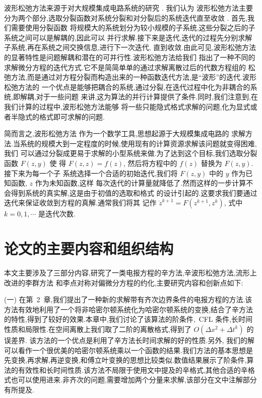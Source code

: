 波形松弛方法来源于对大规模集成电路系统的研究 \cite{lelarasmee1982waveform}. 我们认为
波形松弛方法主要分为两个部分,选取分裂函数对系统分裂和对分裂后的系统迭代直至收敛
 \cite{jiang2009wr,burrage1995parallel,jacob1985waveform}. 首先,我们需要使用分裂函数
 将规模大的系统划分为较小规模的子系统,这些分裂之后的子系统之间可以是解耦的,因此可以
 并行求解.接下来是迭代,迭代的过程先分别求解子系统,再在系统之间交换信息,进行下一次迭代,
直到收敛.由此可见,波形松弛方法的显著特性是问题解耦和潜在的可并行性.波形松弛方法给我们
指出了一种不同的求解微分方程的迭代方式.它不是简简单单的通过求解离散过后的代数方程组的
松弛方法,而是通过对方程分裂而构造出来的一种函数迭代方法,是``波形''的迭代.波形松弛方法的
一个优点是能够把耦合的系统,通过分裂,在迭代过程中化为非耦合的系统,即解耦,对于一些问题
来讲,这为算法的并行计算提供了条件.同时,我们注意到,在我们计算的过程中,波形松弛方法能够
将一些只能隐式格式求解的问题,化为显式或者半隐式的格式即可求解的问题.

简而言之,波形松弛方法 \cite{jiang2009wr} 作为一个数学工具,思想起源于大规模集成电路的
求解方法.当系统的规模大到一定程度的时候,使用现有的计算资源求解该问题就变得困难,我们
可以通过分裂成更易于求解的小型系统来做.为了达到这个目标,我们选取分裂函数 $F(z,y)$ 使
得 $F(z,z)=f(z)$, 然后将方程中的 $f(z)$ 替换为 $F(z,y)$. 接下来为每一个子
系统选择一个合适的初始迭代,我们将 $F(z,y)$ 中的 $y$ 作为已知函数, $z$ 作为未知函数,这样
每次迭代的计算量就降低了.然而这样的一步计算不会得到系统的真实解,这是由于初值的选取和格式
的设计引起的.这要求我们要通过迭代来保证收敛到方程的真解.通常我们将其
记作 $\dot{z}^{k+1}=F(z^{k+1},z^{k})$, 式中 $k=0,1,\cdots$ 是迭代次数.

\section{论文的主要内容和组织结构}

本文主要涉及了三部分内容,研究了一类电报方程的辛方法,辛波形松弛方法,流形上改进的李群方法
和李点对称对偏微分方程的约化,主要研究内容和创新点如下:

(一) 在第~2~章,我们提出了一种新的求解带有齐次边界条件的电报方程的方法.该方法有效地利用了一个将非哈密尔顿系统化为哈密尔顿系统的变换,结合了辛方法的特性,得到了较好的效果.本章中,我们讨论了该算法的阶条件,~CFL 条件,长时间性质和局限性.在空间离散上我们取了二阶的离散格式,得到了 $O(\Delta x^2+ \Delta
t^k)$ 的误差界. 该方法的一个优点是利用了辛方法长时间求解的好的性质.另外, 我们的解可以看作一个很优美的哈密尔顿系统乘以一个函数的结果.我们方法的基本思想是先变换,再求解,再逆变换,和傅立叶变换的思想比较类似.数值结果展示了阶条件,算法的有效性和长时间性质.该方法不局限于使用文中提及的辛格式,其他合适的辛格式也可以使用进来.非齐次的问题,需要增加两个分量来求解,该部分在文中注解部分有所提及.

